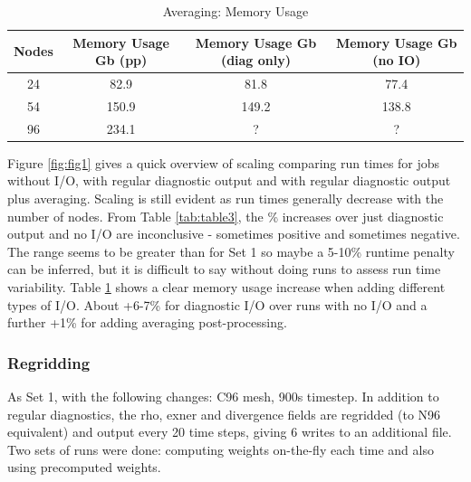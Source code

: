 \begin{table}[ht!]
\scriptsize
  \begin{center}
    \caption{Averaging: Memory Usage}
    \label{tab:table4}
     \begin{tabular}{|c|c|c|c|}
      \textbf{Nodes} & \textbf{Memory Usage Gb (pp) } & \textbf{Memory Usage Gb (diag only)} & \textbf{Memory Usage Gb (no IO)} \\
      \hline
      24 & 82.9 & 81.8 & 77.4 \\
      54 & 150.9 & 149.2 & 138.8 \\
      96 & 234.1 & ? & ? \\
    \end{tabular}
  \end{center}
\end{table}


Figure \ref{fig:fig1} gives a quick overview of scaling comparing run times for jobs without I/O, with regular diagnostic output and with
regular diagnostic output plus averaging. Scaling is still evident as run times generally decrease with the number of nodes. From
Table \ref{tab:table3}, the \% increases over just diagnostic output and no I/O are inconclusive - sometimes positive and sometimes negative. 
The range seems to be greater than for Set 1 so maybe a 5-10\% runtime penalty can be inferred, but it is difficult to say 
without doing runs to assess run time variability. Table \ref{tab:table4} shows a clear memory usage increase when adding different types of I/O. 
About +6-7\% for diagnostic I/O over runs with no I/O and a further +1\% for adding averaging post-processing. 


\subsubsection{Regridding}

As Set 1, with the following changes: C96 mesh, 900s timestep.
In addition to regular diagnostics, the rho, exner and divergence fields are regridded (to N96 equivalent) and output every 20 time steps, giving 6 writes to an additional file. Two sets of runs were done: computing weights on-the-fly each time and also using precomputed weights.

